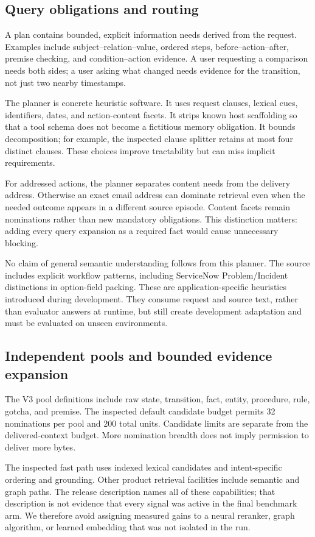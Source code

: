 \documentclass[11pt]{article}
\begin{document}
\subsection{Query obligations and routing}
A plan contains bounded, explicit information needs derived from the request. Examples include subject--relation--value, ordered steps, before--action--after, premise checking, and condition--action evidence. A user requesting a comparison needs both sides; a user asking what changed needs evidence for the transition, not just two nearby timestamps.

The planner is concrete heuristic software. It uses request clauses, lexical cues, identifiers, dates, and action-content facets. It strips known host scaffolding so that a tool schema does not become a fictitious memory obligation. It bounds decomposition; for example, the inspected clause splitter retains at most four distinct clauses. These choices improve tractability but can miss implicit requirements.

For addressed actions, the planner separates content needs from the delivery address. Otherwise an exact email address can dominate retrieval even when the needed outcome appears in a different source episode. Content facets remain nominations rather than new mandatory obligations. This distinction matters: adding every query expansion as a required fact would cause unnecessary blocking.

No claim of general semantic understanding follows from this planner. The source includes explicit workflow patterns, including ServiceNow Problem/Incident distinctions in option-field packing. These are application-specific heuristics introduced during development. They consume request and source text, rather than evaluator answers at runtime, but still create development adaptation and must be evaluated on unseen environments.

\subsection{Independent pools and bounded evidence expansion}
The V3 pool definitions include raw state, transition, fact, entity, procedure, rule, gotcha, and premise. The inspected default candidate budget permits 32 nominations per pool and 200 total units. Candidate limits are separate from the delivered-context budget. More nomination breadth does not imply permission to deliver more bytes.

The inspected fast path uses indexed lexical candidates and intent-specific ordering and grounding. Other product retrieval facilities include semantic and graph paths. The release description names all of these capabilities; that description is not evidence that every signal was active in the final benchmark arm. We therefore avoid assigning measured gains to a neural reranker, graph algorithm, or learned embedding that was not isolated in the run.
\end{document}

